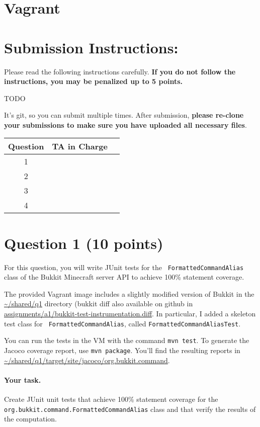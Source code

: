 \documentclass[10pt]{article}
\begin{document}
\section*{Vagrant}

 \section*{Submission Instructions:} 
 Please read the following instructions carefully. {\bf If you do not follow the instructions, you may be 
penalized up to 5 points. }

TODO 
 
It's git, so you can submit multiple times. After submission, {\bf please re-clone your submissions to make sure you have uploaded all necessary files}.
 
 
 \begin{center}
 \begin{tabular}{|c|c|c|}
 \hline
 Question   &  TA in Charge \\ \hline
1 &  \\ \hline
2 &  \\ \hline
3 &  \\ \hline
4 &  \\ \hline
 \end{tabular}
 \end{center}

\newpage

\section*{Question 1 (10 points)}
For this question, you will write JUnit tests for the {\tt
  FormattedCommandAlias} class of the Bukkit Minecraft server API to
achieve 100\% statement coverage.

The provided Vagrant image includes a slightly modified version of
Bukkit in the \url{~/shared/q1} directory (bukkit diff also available on
github in \url{assignments/a1/bukkit-test-instrumentation.diff}.  In
particular, I added a skeleton test class for {\tt
  FormattedCommandAlias}, called {\tt FormattedCommandAliasTest}.

You can run the tests in the VM with the command {\tt mvn test}.  To
generate the Jacoco coverage report, use {\tt mvn package}. You'll
find the resulting reports in
\url{~/shared/q1/target/site/jacoco/org.bukkit.command}.

\paragraph{Your task.} Create JUnit unit tests that achieve 100\% statement 
coverage for the {\tt org.bukkit.command.FormattedCommandAlias} class
and that verify the results of the computation.
\end{document}
